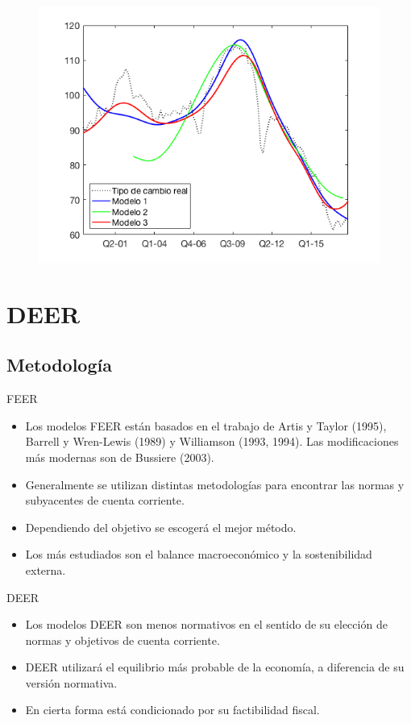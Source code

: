 \documentclass{beamer}
\begin{document}
\begin{frame}
\begin{figure}
\centering
\includegraphics[width=\textwidth]{fig19}
\end{figure}
\end{frame}

\section[DEER]{DEER}
\subsection[Metodología]{Metodología}
\begin{frame}{FEER}
\begin{itemize}
\item Los modelos FEER están basados en el trabajo de Artis y Taylor (1995), Barrell y Wren-Lewis (1989) y Williamson (1993, 1994). Las modificaciones más modernas son de Bussiere (2003).
\item Generalmente se utilizan distintas metodologías para encontrar las normas y subyacentes de cuenta corriente. 
\item Dependiendo del objetivo se escogerá el mejor método.
\item Los más estudiados son el balance macroeconómico y la sostenibilidad externa.
\end{itemize}
\end{frame}

\begin{frame}{DEER}
\begin{itemize}
\item Los modelos DEER son menos normativos en el sentido de su elección de normas y objetivos de cuenta corriente.
\item DEER utilizará el equilibrio más probable de la economía, a diferencia de su versión normativa.
\item En cierta forma está condicionado por su factibilidad fiscal. 
\end{itemize}
\end{frame}
\end{document}
